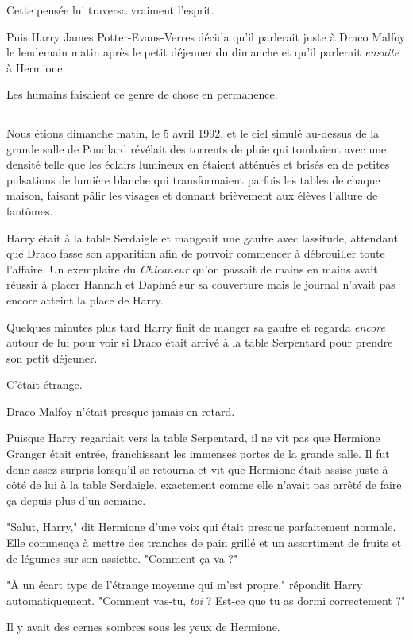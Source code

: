 Cette pensée lui traversa vraiment l'esprit.

Puis Harry James Potter-Evans-Verres décida qu'il parlerait juste à Draco Malfoy le lendemain matin après le petit déjeuner du dimanche et qu'il parlerait \emph{ensuite } à Hermione.

Les humains faisaient ce genre de chose en permanence.
\par\noindent\rule{\textwidth}{0.4pt}
Nous étions dimanche matin, le 5 avril 1992, et le ciel simulé au-dessus de la grande salle de Poudlard révélait des torrents de pluie qui tombaient avec une densité telle que les éclairs lumineux en étaient atténués et brisés en de petites pulsations de lumière blanche qui transformaient parfois les tables de chaque maison, faisant pâlir les visages et donnant brièvement aux élèves l'allure de fantômes.

Harry était à la table Serdaigle et mangeait une gaufre avec lassitude, attendant que Draco fasse son apparition afin de pouvoir commencer à débrouiller toute l'affaire. Un exemplaire du \emph{Chicaneur}  qu'on passait de mains en mains avait réussir à placer Hannah et Daphné sur sa couverture mais le journal n'avait pas encore atteint la place de Harry.

Quelques minutes plus tard Harry finit de manger sa gaufre et regarda \emph{encore}  autour de lui pour voir si Draco était arrivé à la table Serpentard pour prendre son petit déjeuner.

C'était étrange.

Draco Malfoy n'était presque jamais en retard.

Puisque Harry regardait vers la table Serpentard, il ne vit pas que Hermione Granger était entrée, franchissant les immenses portes de la grande salle. Il fut donc assez surpris lorsqu'il se retourna et vit que Hermione était assise juste à côté de lui à la table Serdaigle, exactement comme elle n'avait pas arrêté de faire ça depuis plus d'un semaine.

"Salut, Harry," dit Hermione d'une voix qui était presque parfaitement normale. Elle commença à mettre des tranches de pain grillé et un assortiment de fruits et de légumes sur son assiette. "Comment ça va ?"

"À un écart type de l'étrange moyenne qui m'est propre," répondit Harry automatiquement. "Comment vas-tu, \emph{toi } ? Est-ce que tu as dormi correctement ?"

Il y avait des cernes sombres sous les yeux de Hermione.

